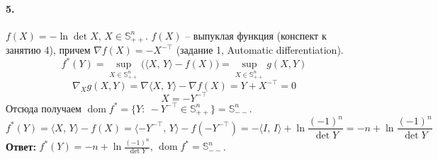 \documentclass{article}
\DeclareMathOperator{\dom}{dom}
\begin{document}
\paragraph{5.} $ f(X) = -\ln \det X,\, X \in \mathbb{S}_{++}^n $. $ f(X) $ -- выпуклая функция (конспект к занятию 4), причем $ \nabla f(X) = -X^{-\top} $ (задание 1, Automatic differentiation).
\[ f^\ast(Y) = \sup\limits_{X \in \mathbb{S}_{++}^n} \big( \langle X,\, Y \rangle - f(X) \big) = \sup\limits_{X \in \mathbb{S}_{++}^n} g(X, Y) \]
\[ \nabla_X g(X, Y) = \nabla \langle X,\, Y \rangle - \nabla f(X) = Y + X^{-\top} = 0 \]
\[ X = -Y^{-\top} \]
Отсюда получаем $\dom f^\ast = \{ Y :\: -Y^{-\top} \in \mathbb{S}_{++}^n \} = \mathbb{S}_{--}^n $.
\[ f^\ast(Y) = \langle X,\, Y \rangle - f(X) = \langle -Y^{-\top},\, Y \rangle - f(-Y^{-\top}) = -\langle I,\, I \rangle + \ln \frac{(-1)^n}{\det Y} = -n + \ln \frac{(-1)^n}{\det Y} \]
\textbf{Ответ:} $ f^\ast(Y) = -n + \ln \frac{(-1)^n}{\det Y},\, \dom f^\ast = \mathbb{S}_{--}^n $.
\end{document}
